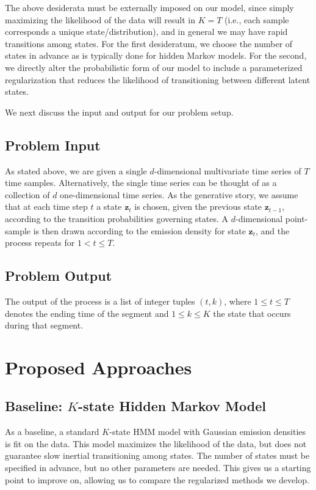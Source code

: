 \documentclass[12pt]{article}
\begin{document}
The above desiderata must be externally imposed on our model, since simply maximizing the likelihood of the data will result in $K = T$ (i.e., each sample corresponds a unique state/distribution), and in general we may have rapid transitions among states. For the first desideratum,  we choose the number of states in advance as is typically done for hidden Markov models. For the second, we directly alter the probabilistic form of our model to include a parameterized regularization that reduces the likelihood of transitioning between different latent states.

We next discuss the input and output for our problem setup.

\subsection{Problem Input}

As stated above, we are given a single $d$-dimensional multivariate time series of $T$ time samples. Alternatively, the single time series can be thought of as a collection of $d$ one-dimensional time series. As the generative story, we assume that at each time step $t$ a state $\mathbf{z}_t$ is chosen, given the previous state $\mathbf{z}_{t-1}$, according to the transition probabilities governing states. A $d$-dimensional point-sample is then drawn according to the emission density for state $\mathbf{z}_t$, and the process repeats for $1 < t \leq T$.

\subsection{Problem Output}

The output of the process is a list of integer tuples $(t, k)$, where $1 \leq t \leq T$ denotes the ending time of the segment and $1 \leq k \leq K$ the state that occurs during that segment. 

\section{Proposed Approaches}

\subsection{Baseline: $K$-state Hidden Markov Model}

As a baseline, a standard $K$-state HMM model with Gaussian emission densities is fit on the data. This model maximizes the likelihood of the data, but does not guarantee slow inertial transitioning among states. The number of states must be specified in advance, but no other parameters are needed. This gives us a starting point to improve on, allowing us to compare the regularized methods we develop.
\end{document}
